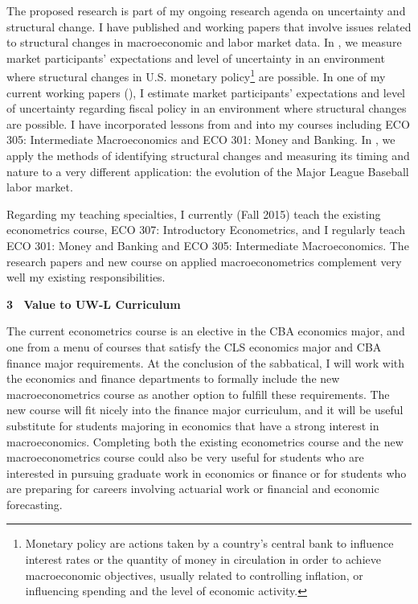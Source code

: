 \documentclass[11pt]{article}
\newcommand{\citee}[1]{\citet{#1}}
\begin{document}
The proposed research is part of my ongoing research agenda on uncertainty and structural change.  I have published and working papers that involve issues related to structural changes in macroeconomic and labor market data.  In \citee{herromurray}, we measure market participants' expectations and level of uncertainty in an environment where structural changes in U.S. monetary policy\footnote{Monetary policy are actions taken by a country's central bank to influence interest rates or the quantity of money in circulation in order to achieve macroeconomic objectives, usually related to controlling inflation, or influencing spending and the level of economic activity.} are possible.  In one of my current working papers (\citee{murray}), I estimate market participants' expectations and level of uncertainty regarding fiscal policy in an environment where structural changes are possible.  I have incorporated lessons from \citee{herromurray} and \citee{murray} into my courses including ECO 305: Intermediate Macroeconomics and ECO 301: Money and Banking.  In \citee{haupertmurray}, we apply the methods of identifying structural changes and measuring its timing and nature to a very different application: the evolution of the Major League Baseball labor market.

Regarding my teaching specialties, I currently (Fall 2015) teach the existing econometrics course, ECO 307: Introductory Econometrics, and I regularly teach ECO 301: Money and Banking and ECO 305: Intermediate Macroeconomics.  The research papers and new course on applied macroeconometrics complement very well my existing responsibilities.

\textbf{3~ Value to UW-L Curriculum}

The current econometrics course is an elective in the CBA economics major, and one from a menu of courses that satisfy the CLS economics major and CBA finance major requirements.  At the conclusion of the sabbatical, I will work with the economics and finance departments to formally include the new macroeconometrics course as another option to fulfill these requirements.  The new course will fit nicely into the finance major curriculum, and it will be useful substitute for students majoring in economics that have a strong interest in macroeconomics.  Completing both the existing econometrics course and the new macroeconometrics course could also be very useful for students who are interested in pursuing graduate work in economics or finance or for students who are preparing for careers involving actuarial work or financial and economic forecasting.
\end{document}
